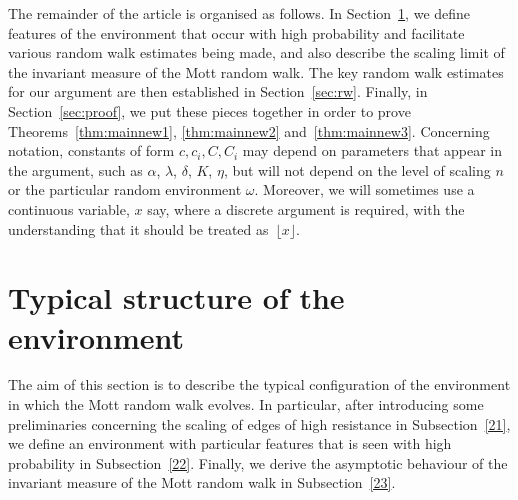 \documentclass[10pt]{amsart}
\theoremstyle{definition}\newtheorem{defi}[theo]{Definition}\newtheorem{rema}[theo]{Remark}\newtheorem{exam}[theo]{Example}\newtheorem{exem}[theo]{Example}\newtheorem{nota}[theo]{Notation}
\begin{document}
The remainder of the article is organised as follows. In Section~\ref{sec:prelim}, we define features of the environment that occur with high probability and facilitate various random walk estimates being made, and also describe the scaling limit of the invariant measure of the Mott random walk. The key random walk estimates for our argument are then established in Section~\ref{sec:rw}. Finally, in Section~\ref{sec:proof}, we put these pieces together in order to prove Theorems~\ref{thm:mainnew1}, \ref{thm:mainnew2} and~\ref{thm:mainnew3}. Concerning notation, constants of form $c,c_i,C,C_i$ may depend on parameters that appear in the argument, such as $\alpha$, $\lambda$, $\delta$, $K$, $\eta$, but will not depend on the level of scaling $n$ or the particular random environment $\omega$. Moreover, we will sometimes use a continuous variable, $x$ say, where a discrete argument is required, with the understanding that it should be treated as~$\lfloor x\rfloor$.

\section{Typical structure of the environment}\label{sec:prelim}

The aim of this section is to describe the typical configuration of the environment in which the Mott random walk evolves. In particular, after introducing some preliminaries concerning the scaling of edges of high resistance in Subsection~\ref{21}, we define an environment with particular features that is seen with high probability in Subsection~\ref{22}. Finally, we derive the asymptotic behaviour of the invariant measure of the Mott random walk in Subsection~\ref{23}.
\end{document}

